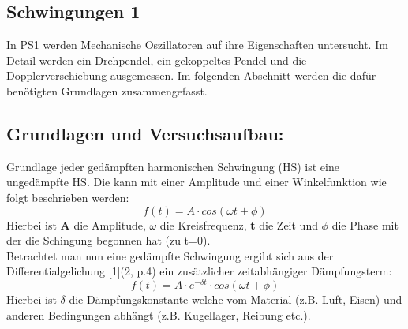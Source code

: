 \documentclass[12pt,a4paper]{article}
\begin{document}
\begin{multicols}{2}




%			




\section{Schwingungen 1}
In PS1 werden Mechanische Oszillatoren auf ihre Eigenschaften untersucht.
Im Detail werden ein Drehpendel, ein gekoppeltes Pendel und die Dopplerverschiebung ausgemessen. Im folgenden Abschnitt werden die dafür benötigten Grundlagen zusammengefasst.

\subsection{Grundlagen und Versuchsaufbau:}
Grundlage jeder gedämpften harmonischen Schwingung (HS) ist eine ungedämpfte HS. Die kann mit einer Amplitude und einer Winkelfunktion wie folgt beschrieben werden:
$$f(t) = A \cdot cos(\omega t + \phi)$$
Hierbei ist \textbf{A} die Amplitude, \textbf{$\omega$} die Kreisfrequenz, \textbf{t} die Zeit und \textbf{$\phi$} die Phase mit der die Schingung begonnen hat (zu t=0).\\
Betrachtet man nun eine gedämpfte Schwingung ergibt sich aus der Differentialgelichung [1](2, p.4) ein zusätzlicher zeitabhängiger Dämpfungsterm: 
$$f(t) = A \cdot e^{- \delta t} \cdot cos(\omega t + \phi)$$ 
Hierbei ist $\delta$ die Dämpfungskonstante welche vom Material (z.B. Luft, Eisen) und anderen Bedingungen abhängt (z.B. Kugellager, Reibung etc.).\\


\end{multicols}
\end{document}
